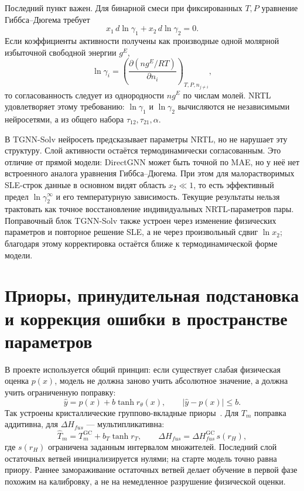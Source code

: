 \documentclass[11pt]{article}
\theoremstyle{definition}
\begin{document}
Последний пункт важен. Для бинарной смеси при фиксированных $T,P$ уравнение Гиббса--Дюгема требует
\begin{equation*}
    x_1\,d\ln\gamma_1+x_2\,d\ln\gamma_2=0 .
\end{equation*}
Если коэффициенты активности получены как производные одной молярной избыточной свободной энергии $g^E$,
\begin{equation*}
    \ln\gamma_i
    =
    \left(\frac{\partial (n g^E/RT)}{\partial n_i}\right)_{T,P,n_{j\ne i}},
\end{equation*}
то согласованность следует из однородности $n g^E$ по числам молей. NRTL удовлетворяет этому требованию: $\ln\gamma_1$ и $\ln\gamma_2$ вычисляются не независимыми нейросетями, а из общего набора $\tau_{12},\tau_{21},\alpha$.

В TGNN-Solv нейросеть предсказывает параметры NRTL, но не нарушает эту структуру. Слой активности остаётся термодинамически согласованным. Это отличие от прямой модели: DirectGNN может быть точной по MAE, но у неё нет встроенного аналога уравнения Гиббса--Дюгема. При этом для малорастворимых SLE-строк данные в основном видят область $x_2\ll1$, то есть эффективный предел $\ln\gamma_2^\infty$ и его температурную зависимость. Текущие результаты нельзя трактовать как точное восстановление индивидуальных NRTL-параметров пары. Поправочный блок TGNN-Solv также устроен через изменение физических параметров и повторное решение SLE, а не через произвольный сдвиг $\ln x_2$; благодаря этому корректировка остаётся ближе к термодинамической форме модели.

\section{Приоры, принудительная подстановка и коррекция ошибки в пространстве параметров}
\label{app:priors-teacher-correction}

В проекте используется общий принцип: если существует слабая физическая оценка $p(x)$, модель не должна заново учить абсолютное значение, а должна учить ограниченную поправку:
\begin{equation*}
    \hat y=p(x)+b\tanh r_\theta(x),
    \qquad |\hat y-p(x)|\leq b .
\end{equation*}
Так устроены кристаллические группово-вкладные приоры~\cite{joback1987,marrero2001}. Для $T_m$ поправка аддитивна, для $\Delta H_{fus}$ --- мультипликативна:
\begin{equation*}
    \widehat T_m=T_m^{\mathrm{GC}}+b_T\tanh r_T,
    \qquad
    \widehat{\Delta H}_{fus}=\Delta H_{fus}^{\mathrm{GC}}\,s(r_H),
\end{equation*}
где $s(r_H)$ ограничена заданным интервалом множителей. Последний слой остаточных ветвей инициализируется нулями; на старте модель точно равна приору. Раннее замораживание остаточных ветвей делает обучение в первой фазе похожим на калибровку, а не на немедленное разрушение физической оценки.
\end{document}
